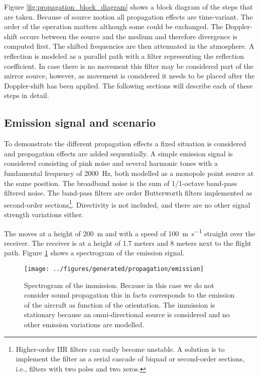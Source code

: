 Figure \ref{fig:propagation_block_diagram} shows a block diagram of the steps
that are taken. Because of source motion all propagation effects are
time-variant. The order of the operation matters although some could be
exchanged. The Doppler-shift occurs between the source and the medium and
therefore divergence is computed first. The shifted frequencies are then
attenuated in the atmosphere. A reflection is modeled as a parallel path with a
filter representing the reflection coefficient. In case there is no movement
this filter may be considered part of the mirror source, however, as movement is
considered it needs to be placed after the Doppler-shift has been applied. The
following sections will describe each of these steps in detail.

\subsection{Emission signal and scenario}
To demonstrate the different propagation effects a fixed situation is considered
and propagation effects are added sequentially. A simple emission signal is
considered consisting of pink noise and several harmonic tones with a
fundamental frequency of \SI{2000}{\hertz}, both modelled as a monopole point
source at the same position. The broadband noise is the sum of 1/1-octave
band-pass filtered noise. The band-pass filters are  order Butterworth
filters implemented as second-order sections\footnote{
Higher-order IIR filters can easily become unstable. A solution is to implement
the filter as a serial cascade of biquad or second-order sections, i.e., filters
with two poles and two zeros.}. Directivity is not included, and
there are no other signal strength variations either.

The  moves at a height of \SI{200}{\meter} and with a
speed of \SI{100}{\meter\per\second} straight over the receiver.
The receiver is at a height of 1.7 meters and 8 meters next to the flight path.
Figure \ref{fig:implementation:propagation:emission} shows a spectrogram of the
emission signal.

\clearpage

\begin{figure}[H]
  \centering
  \texttt{[image: ../figures/generated/propagation/emission]}
  \caption{Spectrogram of the immission. Because in this case we do not consider sound propagation this in facts corresponds to the emission of the aircraft as function of the orientation. The immission is stationary because an omni-directional source is considered and no other emission variations are modelled.}
  \label{fig:implementation:propagation:emission}
\end{figure}


